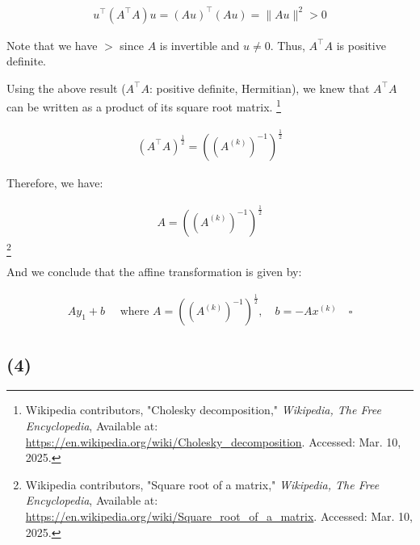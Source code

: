\documentclass{article}
\begin{document}
\begin{align*}
    u^\intercal (A^\intercal A) u = (A u)^\intercal (A u)  = \|A u\|^2 > 0
\end{align*}

Note that we have $>$ since $A$ is invertible and $u \ne 0$.
Thus, $A^\intercal A$ is positive definite.
\bigskip

Using the above result ($A^\intercal A$: positive definite, Hermitian),
we knew that $A^\intercal A$ can be written as a product of its square root matrix.
\footnote{Wikipedia contributors, "Cholesky decomposition," \textit{Wikipedia, The Free Encyclopedia}, Available at: \url{https://en.wikipedia.org/wiki/Cholesky_decomposition}. Accessed: Mar. 10, 2025.}

\begin{align*}
    (A^\intercal A)^{\frac{1}{2}} = ((A^{(k)})^{-1})^{\frac{1}{2}}
\end{align*}

Therefore, we have:

\begin{align*}
    A = ((A^{(k)})^{-1})^{\frac{1}{2}}
\end{align*}
\footnote{Wikipedia contributors, "Square root of a matrix," \textit{Wikipedia, The Free Encyclopedia}, Available at: \url{https://en.wikipedia.org/wiki/Square_root_of_a_matrix}. Accessed: Mar. 10, 2025.}

And we conclude that the affine transformation is given by:

\begin{align*}
    A y_1 + b \quad \text{ where }
    A = ((A^{(k)})^{-1})^{\frac{1}{2}}, \quad b = -A x^{(k)} \quad \square
\end{align*}



\begin{comment}
\begin{align*}
    y_1 = A^{-1}(y_1' - b) 
\end{align*}

since $A$ is guaranteed to be invertible by the definition of affine transformation.
Plugging it into $(*)$, we have:

\begin{align*}
    &(A^{-1}(y_1' - b) - x^{(k)})^\intercal (A^{(k)})^{-1} (A^{-1}(y_1' - b) - x^{(k)}) \le 1 \\
    \Rightarrow \ & (A^{-1}y_1' - A^{-1}b - x^{(k)})^\intercal \textcolor{orange}{(A^{(k)})^{-1}} (A^{-1}y_1' - A^{-1}b - x^{(k)}) \le 1 \\
    \Rightarrow \ & \left[((y_1')^\intercal (A^{-1})^\intercal\textcolor{orange}{(A^{(k)})^{-1}} - b^\intercal(A^{-1})^\intercal\textcolor{orange}{(A^{(k)})^{-1}} - (x^{(k)})^\intercal\textcolor{orange}{(A^{(k)})^{-1}}) \right]
    (A^{-1}y_1' - A^{-1}b - x^{(k)}) \le 1 \\
\end{align*}
\end{comment}



\subsection*{(4)}
\end{document}
